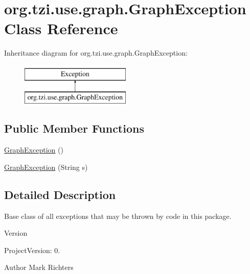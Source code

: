 \hypertarget{classorg_1_1tzi_1_1use_1_1graph_1_1_graph_exception}{\section{org.\-tzi.\-use.\-graph.\-Graph\-Exception Class Reference}
\label{classorg_1_1tzi_1_1use_1_1graph_1_1_graph_exception}
}
Inheritance diagram for org.\-tzi.\-use.\-graph.\-Graph\-Exception\-:\begin{figure}[H]
\begin{center}
\leavevmode
\includegraphics[height=2.000000cm]{classorg_1_1tzi_1_1use_1_1graph_1_1_graph_exception}
\end{center}
\end{figure}
\subsection*{Public Member Functions}
\begin{DoxyCompactItemize}
\item 
\hyperlink{classorg_1_1tzi_1_1use_1_1graph_1_1_graph_exception_a4dd8e0a3095e65a9b81fa08547172d34}{Graph\-Exception} ()
\item 
\hyperlink{classorg_1_1tzi_1_1use_1_1graph_1_1_graph_exception_ab5f5bd81f62f35751180923ba326a46c}{Graph\-Exception} (String s)
\end{DoxyCompactItemize}


\subsection{Detailed Description}
Base class of all exceptions that may be thrown by code in this package.

\begin{DoxyVersion}{Version}

\end{DoxyVersion}
\begin{DoxyParagraph}{Project\-Version\-:}
0. 
\end{DoxyParagraph}
\begin{DoxyAuthor}{Author}
Mark Richters 
\end{DoxyAuthor}


